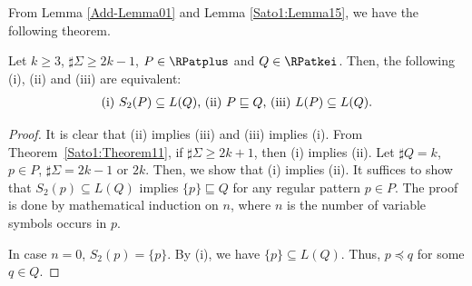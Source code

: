 From Lemma \ref{Add-Lemma01} 
and Lemma \ref{Sato1:Lemma15}, 
we have the following theorem.


\begin{thm}\label{Theorem17}
    Let $k \geq 3$, $\sharp\Sigma \geq 2k-1$, $P \in \RPatplus$ and
    $Q \in \RPatkei$.
    Then, the following (i), (ii) and (iii) are equivalent:
    \[
        \begin{tabular}{ll}
            $(\mathrm{i})$ $S_{2}(P) \subseteq L(Q)$,
            $(\mathrm{ii})$ $P \sqsubseteq Q$,
            $(\mathrm{iii})$ $L(P) \subseteq L(Q)$.
        \end{tabular}
    \]
\end{thm}


\begin{proof}
    It is clear that (ii) implies (iii) and (iii) implies (i).
    From Theorem~\ref{Sato1:Theorem11}, 
    if $\sharp\Sigma \geq 2k+1$, then
    (i) implies (ii).
    Let $\sharp Q = k$, $p \in P$, $\sharp\Sigma = 2k-1$ or $2k$.
    Then, we show that (i) implies (ii).
    It suffices to show that $S_{2}(p) \subseteq L(Q)$ implies {\color{black}$\{p\} \sqsubseteq Q$}
    for any regular pattern {\color{black}$p \in P$}.
    The proof is done by mathematical induction on $n$, where $n$ is the number of variable symbols occurs in $p$.

    In case $n=0$, $S_{2}(p) = \{p\}$.
    By (i), we have {\color{black}$\{p\} \subseteq L(Q)$}. Thus, $p \preceq q$ for some $q \in Q$.


\end{proof}
